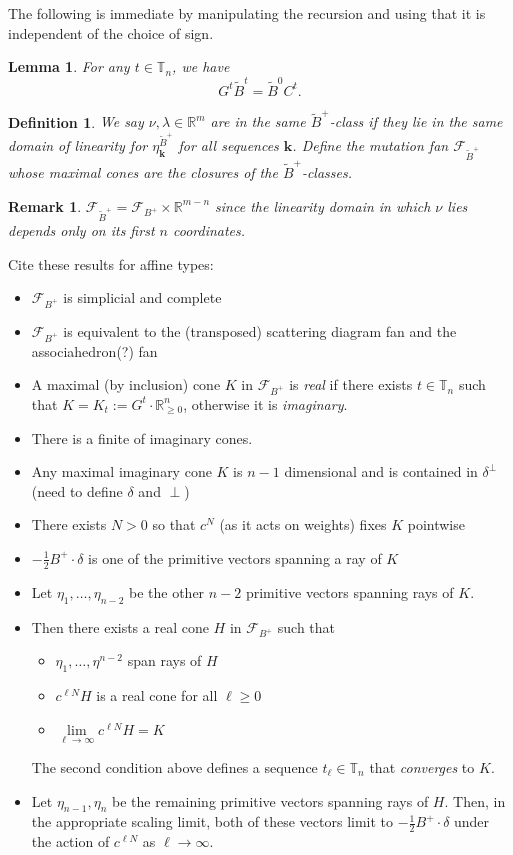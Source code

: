 \documentclass{amsart}
\newtheorem{definition}[theorem]{Definition}
\newtheorem{lemma}[theorem]{Lemma}
\newtheorem{remark}[theorem]{Remark}
\numberwithin{theorem}{section}
\newcommand{\bfk}{{\boldsymbol{k}}}
\newcommand{\cF}{\mathcal{F}}
\newcommand{\RR}{\mathbb{R}}
\newcommand{\TT}{\mathbb{T}}
\begin{document}
  The following is immediate by manipulating the recursion and using that it is independent of the choice of sign.
  \begin{lemma}
    For any $t\in\TT_n$, we have
    \[G^t\tilde B^t=\tilde B^0 C^t.\]
  \end{lemma}

  \begin{definition}
    We say $\nu,\lambda\in\RR^m$ are in the same \emph{$\tilde B^+$-class} if they lie in the same domain of linearity for $\eta^{\tilde B^+}_\bfk$ for all sequences $\bfk$.
    Define the \emph{mutation fan} $\cF_{\tilde B^+}$ whose maximal cones are the closures of the $\tilde B^+$-classes.
  \end{definition}
  \begin{remark}
    $\cF_{\tilde B^+}=\cF_{B^+}\times \RR^{m-n}$ since the linearity domain in which $\nu$ lies depends only on its first $n$ coordinates.
  \end{remark}

  Cite these results for affine types:
  \begin{itemize}
    \item $\cF_{B^+}$ is simplicial and complete 
    \item $\cF_{B^+}$ is equivalent to the (transposed) scattering diagram fan and the associahedron(?) fan
    \item A maximal (by inclusion) cone $K$ in $\cF_{B^+}$ is \emph{real} if there exists $t\in\TT_n$ such that $K=K_t:=G^t\cdot\RR^n_{\ge0}$, otherwise it is \emph{imaginary}.
    \item There is a finite of imaginary cones.
    \item Any maximal imaginary cone $K$ is $n-1$ dimensional and is contained in $\delta^\perp$ (need to define $\delta$ and $\perp$)
    \item There exists $N>0$ so that $c^N$ (as it acts on weights) fixes $K$ pointwise
    \item $-\frac12 B^+\cdot\delta$ is one of the primitive vectors spanning a ray of $K$
    \item Let $\eta_1,\ldots,\eta_{n-2}$ be the other $n-2$ primitive vectors spanning rays of $K$.  
    \item Then there exists a real cone $H$ in $\cF_{B^+}$ such that
      \begin{itemize}
        \item $\eta_1,\ldots,\eta^{n-2}$ span rays of $H$
        \item $c^{\ell N} H$ is a real cone for all $\ell\ge0$
        \item $\lim\limits_{\ell\to\infty} c^{\ell N} H = K$
      \end{itemize}
      The second condition above defines a sequence $t_\ell\in\TT_n$ that \emph{converges} to $K$.
    \item Let $\eta_{n-1},\eta_n$ be the remaining primitive vectors spanning rays of $H$.  Then, in the appropriate scaling limit, both of these vectors limit to $-\frac12 B^+\cdot\delta$ under the action of $c^{\ell N}$ as $\ell\to\infty$.
  \end{itemize}
\end{document}
